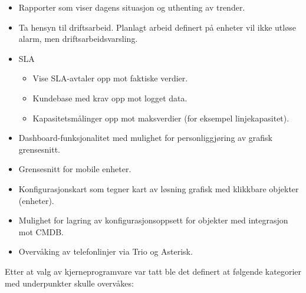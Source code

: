 \begin{itemize}
	\item Rapporter som viser dagens situasjon og uthenting av trender.
	\item Ta hensyn til driftsarbeid. Planlagt arbeid definert på enheter vil ikke utløse alarm, men driftsarbeidsvarsling.
	\item SLA
	\begin{itemize}
		\item Vise SLA-avtaler opp mot faktiske verdier.
		\item Kundebase med krav opp mot logget data.
		\item Kapasitetsmålinger opp mot maksverdier (for eksempel linjekapasitet).
	\end{itemize}
	\item Dashboard-funksjonalitet med mulighet for personliggjøring av grafisk grensesnitt.
	\item Grensesnitt for mobile enheter.
	\item Konfigurasjonskart som tegner kart av løsning grafisk med klikkbare objekter (enheter).
	\item Mulighet for lagring av konfigurasjonsoppsett for objekter med integrasjon mot CMDB.
	\item Overvåking av telefonlinjer via Trio og Asterisk.
\end{itemize}

Etter at valg av kjerneprogramvare var tatt ble det definert at følgende kategorier med underpunkter skulle overvåkes:

